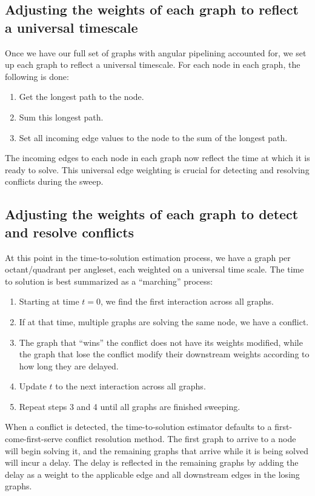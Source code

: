 \subsection{Adjusting the weights of each graph to reflect a universal timescale}

Once we have our full set of graphs with angular pipelining accounted for, we set up each graph to reflect a universal timescale. For each node in each graph, the following is done:
\begin{enumerate}
  \item Get the longest path to the node.
  \item Sum this longest path.
  \item Set all incoming edge values to the node to the sum of the longest path. 
\end{enumerate}
The incoming edges to each node in each graph now reflect the time at which it is ready to solve. This universal edge weighting is crucial for detecting and resolving conflicts during the sweep.

\subsection{Adjusting the weights of each graph to detect and resolve conflicts}

At this point in the time-to-solution estimation process, we have a graph per octant/quadrant per angleset, each weighted on a universal time scale. The time to solution is best summarized as a ``marching'' process:
\begin{enumerate}
  \item Starting at time $t=0$, we find the first interaction across all graphs. 
  \item If at that time, multiple graphs are solving the same node, we have a conflict. 
  \item The graph that ``wins'' the conflict does not have its weights modified, while the graph that lose the conflict modify their downstream weights according to how long they are delayed. 
  \item Update $t$ to the next interaction across all graphs. 
  \item Repeat steps 3 and 4 until all graphs are finished sweeping.
\end{enumerate}

When a conflict is detected, the time-to-solution estimator defaults to a first-come-first-serve conflict resolution method. The first graph to arrive to a node will begin solving it, and the remaining graphs that arrive while it is being solved will incur a delay. The delay is reflected in the remaining graphs by adding the delay as a weight to the applicable edge and all downstream edges in the losing graphs. 

